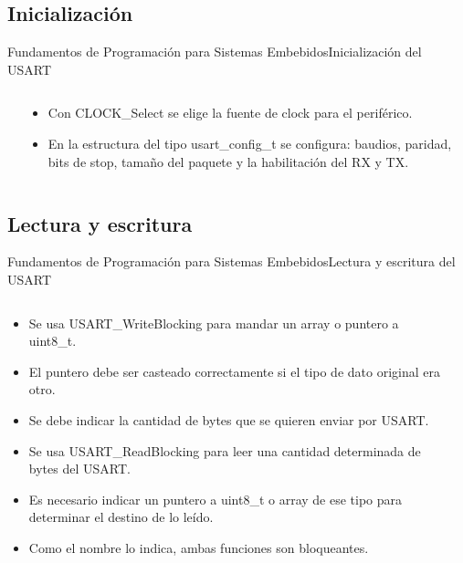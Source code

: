 \documentclass[aspectratio=169, xcolor=dvipsnames]{beamer}
\begin{document}
\subsection{Inicialización}
\begin{frame}{Fundamentos de Programación para Sistemas Embebidos}{Inicialización del USART}
\begin{columns}
\begin{column}{0.6\textwidth}

\end{column}
\begin{column}{0.4\textwidth}
\begin{itemize}
    \item Con \textcolor{myblue}{CLOCK\_Select} se elige la fuente de clock para el periférico.
    \item En la estructura del tipo \textcolor{myblue}{usart\_config\_t} se  configura: baudios, paridad, bits de stop, tamaño del paquete y la habilitación del RX y TX.
\end{itemize}
\end{column}
\end{columns}
\end{frame}

\subsection{Lectura y escritura}
\begin{frame}{Fundamentos de Programación para Sistemas Embebidos}{Lectura y escritura del USART}
\begin{columns}
\begin{column}{0.7\textwidth}
\begin{itemize}
    \item Se usa \textcolor{myblue}{USART\_WriteBlocking} para mandar un array o puntero a \textcolor{myblue}{uint8\_t}.
    \item El puntero debe ser casteado correctamente si el tipo de dato original era otro.
    \item Se debe indicar la cantidad de bytes que se quieren enviar por USART.
    \item Se usa \textcolor{myblue}{USART\_ReadBlocking} para leer una cantidad determinada de bytes del USART.
    \item Es necesario indicar un puntero a \textcolor{myblue}{uint8\_t} o array de ese tipo para determinar el destino de lo leído.
    \item Como el nombre lo indica, ambas funciones son bloqueantes.
\end{itemize}
\end{column}
\begin{column}{0.3\textwidth}

\end{column}
\end{columns}
\end{frame}
\end{document}

